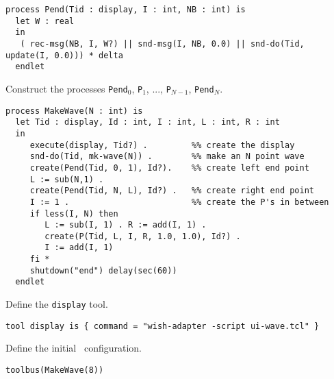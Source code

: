 \small
\begin{verbatim}
process Pend(Tid : display, I : int, NB : int) is
  let W : real
  in
   ( rec-msg(NB, I, W?) || snd-msg(I, NB, 0.0) || snd-do(Tid, update(I, 0.0))) * delta
  endlet

\end{verbatim}
\noindent
\normalsize
 Construct the processes {\tt Pend}$_0$, {\tt P}$_1$, ..., {\tt P}$_{N-1}$, {\tt Pend}$_N$.

\small
\begin{verbatim}
process MakeWave(N : int) is
  let Tid : display, Id : int, I : int, L : int, R : int
  in
     execute(display, Tid?) .         %% create the display
     snd-do(Tid, mk-wave(N)) .        %% make an N point wave
     create(Pend(Tid, 0, 1), Id?).    %% create left end point
     L := sub(N,1) .
     create(Pend(Tid, N, L), Id?) .   %% create right end point
     I := 1 .                         %% create the P's in between
     if less(I, N) then
        L := sub(I, 1) . R := add(I, 1) .
        create(P(Tid, L, I, R, 1.0, 1.0), Id?) .
        I := add(I, 1)
     fi *
     shutdown("end") delay(sec(60))
  endlet

\end{verbatim}
\noindent
\normalsize
 Define the {\tt display} tool.

\small
\begin{verbatim}
tool display is { command = "wish-adapter -script ui-wave.tcl" }

\end{verbatim}
\noindent
\normalsize
 Define the initial \TB\ configuration.

\small
\begin{verbatim}
toolbus(MakeWave(8))
\end{verbatim}
\normalsize
